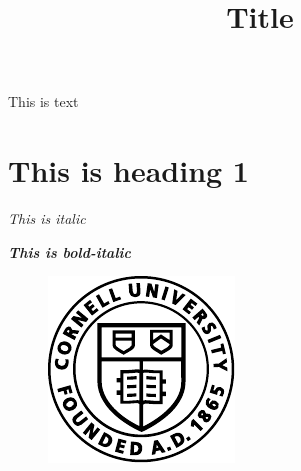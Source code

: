 \documentclass{article}
\title{Title}
\begin{document}
\maketitle

This is text

\section{This is heading 1}

\textit{This is italic}

\textbf{\textit{This is bold-italic}}

\begin{figure}
    \includegraphics{figures/logo.pdf}
\end{figure}
\end{document}
